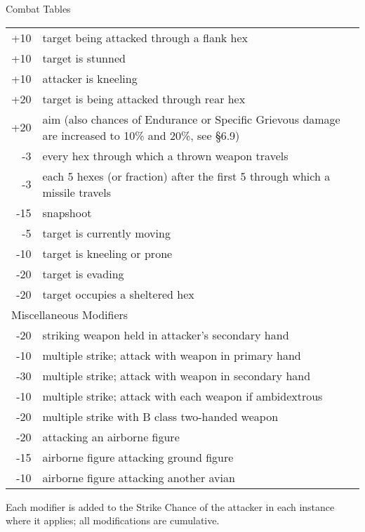 \begin{Table}{Combat Tables}
\begin{multicols}{3}
\begin{tabularx}{\columnwidth}{rX}
+10	& target being attacked through a flank hex \\
+10	& target is stunned \\
+10	& attacker is kneeling \\
+20	& target is being attacked through rear hex \\
+20	& aim (also chances of Endurance or Specific Grievous damage are increased to 10\% and 20\%, see §6.9) \\
-3	& every hex through which a thrown weapon travels \\
-3	& each 5 hexes (or fraction) after the first 5 through which a missile travels \\
-15	& snapshoot \\
-5	& target is currently moving \\
-10	& target is kneeling or prone \\
-20	& target is evading \\
-20	& target occupies a sheltered hex \\
\multicolumn{2}{l}{Miscellaneous Modifiers} \\
-20	& striking weapon held in attacker’s secondary hand \\
-10	& multiple strike; attack with weapon in primary hand \\
-30	& multiple strike; attack with weapon in secondary hand \\
-10	& multiple strike; attack with each weapon if ambidextrous \\
-20	& multiple strike with B class two-handed weapon \\
-20	& attacking an airborne figure \\
-15	& airborne figure attacking ground figure \\
-10	& airborne figure attacking another avian \\
\end{tabularx}
Each modifier is added to the Strike Chance of the attacker in each
instance where it applies; all modifications are cumulative.

\columnbreak


\end{multicols}
\end{Table}
